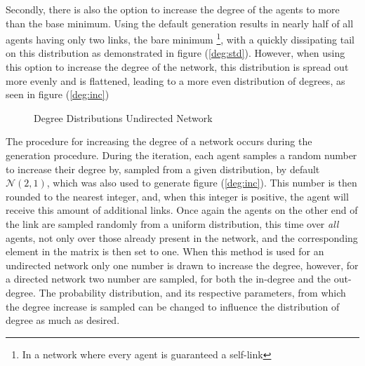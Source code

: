 \documentclass{article}
\begin{document}
Secondly, there is also the option to increase the degree of the agents to more than the base minimum. Using the default generation results in nearly half of all agents having only two links, the bare minimum \footnote{In a network where every agent is guaranteed a self-link}, with a quickly dissipating tail on this distribution as demonstrated in figure (\ref{deg:std}). However, when using this option to increase the degree of the network, this distribution is spread out more evenly and is flattened, leading to a more even distribution of degrees, as seen in figure (\ref{deg:inc})
\begin{figure}[!htbp]
  \centering
  \hfill
  \caption{Degree Distributions Undirected Network}
\end{figure}

\newpage

The procedure for increasing the degree of a network occurs during the generation procedure. During the iteration, each agent samples a random number to increase their degree by, sampled from a given distribution, by default $\mathcal{N}(2,1)$, which was also used to generate figure (\ref{deg:inc}). This number is then rounded to the nearest integer, and, when this integer is positive, the agent will receive this amount of additional links. Once again the agents on the other end of the link are sampled randomly from a uniform distribution, this time over \emph{all} agents, not only over those already present in the network, and the corresponding element in the matrix is then set to one. When this method is used for an undirected network only one number is drawn to increase the degree, however, for a directed network two number are sampled, for both the in-degree and the out-degree.
The probability distribution, and its respective parameters, from which the degree increase is sampled can be changed to influence the distribution of degree as much as desired.
\newline
\end{document}
